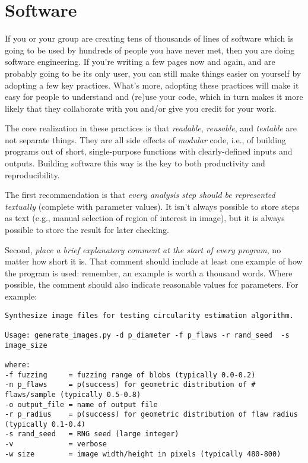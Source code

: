 \documentclass[10pt]{article}
\newcommand{\recommend}[1]{\textit{#1}}
\begin{document}
\section{Software}\label{software}

If you or your group are creating tens of thousands of lines of software
which is going to be used by hundreds of people you have never met, then
you are doing software engineering. If you're writing a few pages now
and again, and are probably going to be its only user, you can still
make things easier on yourself by adopting a few key practices. What's
more, adopting these practices will make it easy for people to
understand and (re)use your code, which in turn makes it more likely
that they collaborate with you and/or give you credit for your work.

The core realization in these practices is that \emph{readable},
\emph{reusable}, and \emph{testable} are not separate things. They are
all side effects of \emph{modular} code, i.e., of building programs out
of short, single-purpose functions with clearly-defined inputs and
outputs. Building software this way is the key to both productivity and
reproducibility.

The first recommendation is that \recommend{every analysis step should
  be represented textually} (complete with parameter values). It isn't
always possible to store steps as text (e.g., manual selection of
region of interest in image), but it is always possible to store the
result for later checking.

Second, \recommend{place a brief explanatory comment at the start of
  every program}, no matter how short it is. That comment should
include at least one example of how the program is used: remember, an
example is worth a thousand words. Where possible, the comment should
also indicate reasonable values for parameters. For example:

\begin{verbatim}
Synthesize image files for testing circularity estimation algorithm.

Usage: generate_images.py -d p_diameter -f p_flaws -r rand_seed  -s image_size

where:
-f fuzzing     = fuzzing range of blobs (typically 0.0-0.2)
-n p_flaws     = p(success) for geometric distribution of # flaws/sample (typically 0.5-0.8)
-o output_file = name of output file
-r p_radius    = p(success) for geometric distribution of flaw radius (typically 0.1-0.4)
-s rand_seed   = RNG seed (large integer)
-v             = verbose
-w size        = image width/height in pixels (typically 480-800)
\end{verbatim}
\end{document}
